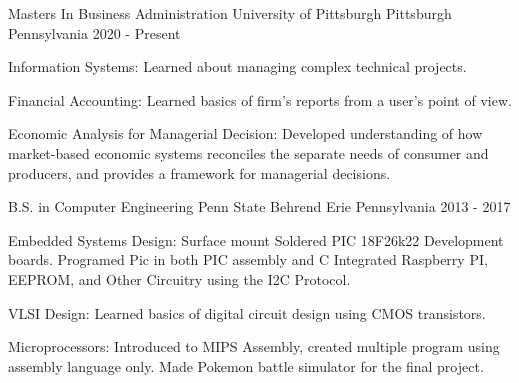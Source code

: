 


\begin{cventries}

\cventry
{Masters In Business Administration} %
{University of Pittsburgh} %
{Pittsburgh Pennsylvania} %
{2020 - Present} %
{ %
\begin{cvitems}
\item 
{
    Information Systems: Learned about managing complex technical projects.
}
\item 
{
    Financial Accounting: Learned basics of firm's reports from a user's point of view.
}
\item 
{
    Economic Analysis for Managerial Decision: Developed understanding of how market-based 
    economic systems reconciles the separate needs of consumer and producers, and provides 
    a framework for managerial decisions.
}
\end{cvitems}
}

\cventry
{B.S. in Computer Engineering} %
{Penn State Behrend} %
{Erie Pennsylvania} %
{2013 - 2017} %
{ %
\begin{cvitems}
\item 
{
    Embedded Systems Design: Surface mount Soldered PIC 18F26k22 Development boards. 
    Programed Pic in both PIC assembly and C Integrated Raspberry PI, EEPROM, and 
    Other Circuitry using the I2C Protocol.
}
\item 
{
    VLSI Design: Learned basics of digital circuit design using CMOS transistors.
}
\item 
{
    Microprocessors: Introduced to MIPS Assembly, created multiple program using assembly language only. 
    Made Pokemon battle simulator for the final project. 
}
\end{cvitems}
}


\end{cventries}